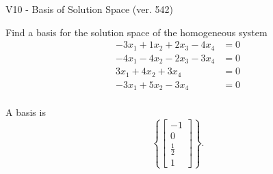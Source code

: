 \begin{exercise}
  \begin{exerciseTitle}V10 - Basis of Solution Space (ver. 542)\end{exerciseTitle}
  \begin{exerciseStatement}
    Find a basis for the solution space of the homogeneous system 
\begin{align*}
 -3 x_ 1 + 1 x_ 2 + 2 x_ 3 -4 x_ 4 &= 0  \\ 
  -4 x_ 1 -4 x_ 2 -2 x_ 3 -3 x_ 4 &= 0  \\ 
  3 x_ 1 + 4 x_ 2 + 3 x_ 4 &= 0  \\ 
  -3 x_ 1 + 5 x_ 2 -3 x_ 4 &= 0  \\ 
 \end{align*}


 
  \end{exerciseStatement}

  \begin{exerciseAnswer}
   A basis is   
\[\left\{\left[\begin{array}{c}
-1 \\
0 \\
\frac{1}{2} \\
1
\end{array}\right]\right\}.\]

  


  \end{exerciseAnswer}
\end{exercise}